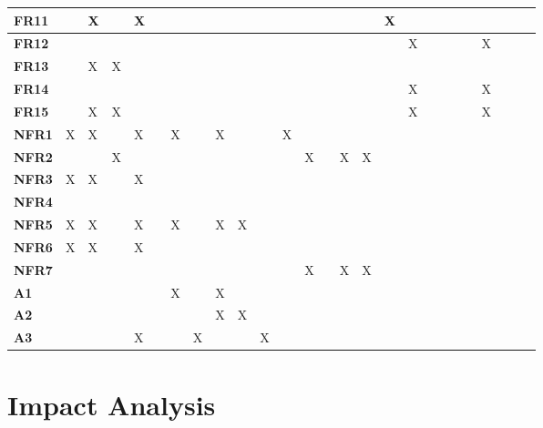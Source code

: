 \documentclass[12pt]{article}
\begin{document}
\begin{table}[h!]
{\begin{tabular}{|l|l|l|l|l|l|l|l|l|l|l|l|l|l|l|l|l|l|l|l|l|l|l|l|l|l|}
\textbf{FR11} &   & X &   & X &   &   &   &   &   &   &   &   &   &   &   & X &   &   &  &   &   &   &   &   &   \\ \hline
\textbf{FR12} &   &   &   &   &   &   &   &   &   &   &   &   &   &   &   &   & X &   &  &   &   & X &   &   &   \\ \hline
\textbf{FR13} &   & X & X &   &   &   &   &   &   &   &   &   &   &   &   &   &   &   &  &   &   &   &   &   &   \\ \hline
\textbf{FR14} &   &   &   &   &   &   &   &   &   &   &   &   &   &   &   &   & X &   &  &   &   & X &   &   &   \\ \hline
\textbf{FR15} &   & X & X &   &   &   &   &   &   &   &   &   &   &   &   &   & X &   &  &   &   & X &   &   &   \\ \hline
\textbf{NFR1} & X & X &   & X &   & X &   & X &   &   & X &   &   &   &   &   &   &   &  &   &   &   &   &   &   \\ \hline
\textbf{NFR2} &   &   & X &   &   &   &   &   &   &   &   & X &   & X & X &   &   &   &  &   &   &   &   &   &   \\ \hline
\textbf{NFR3} & X & X &   & X &   &   &   &   &   &   &   &   &   &   &   &   &   &   &  &   &   &   &   &   &   \\ \hline
\textbf{NFR4} &   &   &   &   &   &   &   &   &   &   &   &   &   &   &   &   &   &   &  &   &   &   &   &   &   \\ \hline
\textbf{NFR5} & X & X &   & X &   & X &   & X & X &   &   &   &   &   &   &   &   &   &  &   &   &   &   &   &   \\ \hline
\textbf{NFR6} & X & X &   & X &   &   &   &   &   &   &   &   &   &   &   &   &   &   &  &   &   &   &   &   &   \\ \hline
\textbf{NFR7} &   &   &   &   &   &   &   &   &   &   &   & X &   & X & X &   &   &   &  &   &   &   &   &   &   \\ \hline
\textbf{A1}   &   &   &   &   &   & X &   & X &   &   &   &   &   &   &   &   &   &   &  &   &   &   &   &   &   \\ \hline
\textbf{A2}   &   &   &   &   &   &   &   & X & X &   &   &   &   &   &   &   &   &   &  &   &   &   &   &   &   \\ \hline
\textbf{A3}   &   &   &   & X &   &   & X &   &   & X &   &   &   &   &   &   &   &   &  &   &   &   &   &   &   \\ \hline
\end{tabular}
}
\end{table}


\section{Impact Analysis}
\end{document}
